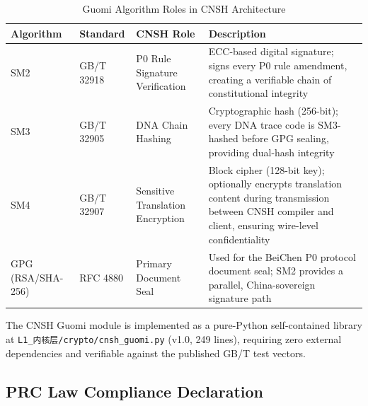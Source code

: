 \begin{table}[h]
\centering
\caption{Guomi Algorithm Roles in CNSH Architecture}
\renewcommand{\arraystretch}{1.3}
\begin{tabular}{lllp{6cm}}
\toprule
\textbf{Algorithm} & \textbf{Standard} & \textbf{CNSH Role} & \textbf{Description} \\
\midrule
SM2 & GB/T 32918 & P0 Rule Signature Verification
  & ECC-based digital signature; signs every P0 rule amendment,
    creating a verifiable chain of constitutional integrity \\
SM3 & GB/T 32905 & DNA Chain Hashing
  & Cryptographic hash (256-bit); every DNA trace code is
    SM3-hashed before GPG sealing, providing dual-hash integrity \\
SM4 & GB/T 32907 & Sensitive Translation Encryption
  & Block cipher (128-bit key); optionally encrypts
    translation content during transmission between
    CNSH compiler and client, ensuring wire-level confidentiality \\
\midrule
GPG (RSA/SHA-256) & RFC 4880 & Primary Document Seal
  & Used for the BeiChen P0 protocol document seal;
    SM2 provides a parallel, China-sovereign signature path \\
\bottomrule
\end{tabular}
\end{table}

\noindent The CNSH Guomi module is implemented as a pure-Python
self-contained library at \texttt{L1\_内核层/crypto/cnsh\_guomi.py}
(v1.0, 249 lines), requiring zero external dependencies and
verifiable against the published GB/T test vectors.

\subsection{PRC Law Compliance Declaration}

